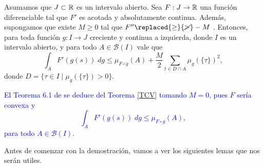 \begin{thm}\label{TCV}
Asumamos que $J\subset\mathbb{R}$ es un intervalo abierto. Sea $F:J\to \mathbb{R}$ una función diferenciable tal que $F'$ es acotada y absolutamente continua. Además,  supongamos que existe $M\geq 0$ tal que $F''\replaced{\geq}{\cancel{>}}-M$ . Entonces, para toda función $g:I\to J$ creciente y  continua a izquierda,  donde $I$ es un intervalo abierto, y para todo $A\in \mathcal{B}(I)$ vale que
$$\int_{A}F'(g(s)) \; dg\leq \mu_{F\circ g}(A)+\dfrac{M}{2}\sum_{t\in D\cap A}\mu_{g}(\{\tau\})^2,$$
donde $D=\{\tau\in I \mid \mu_{g}(\{\tau\})>0\}$.\label{Teorema medidas}
\end{thm}
\begin{obs} \label{Teorema 6.1}
\textcolor{blue}{El Teorema 6.1  de \cite{P.Mazzone} se deduce del Teorema  \ref{TCV} tomando $M=0$, pues $F$ sería convexa y 
$$\int_{A}F'(g(s)) \; dg\leq \mu_{F\circ g}(A),$$
para todo $A\in \mathcal{B}(I)$.}
\end{obs}
Antes de comenzar con la demostración, vamos a ver los siguientes lemas que nos serán utiles.

